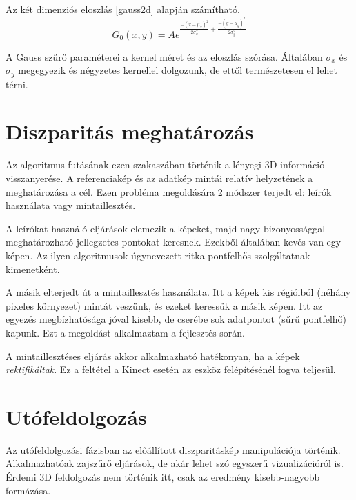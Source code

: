 Az két dimenziós eloszlás \eqref{gauss2d} alapján számítható.
\begin{equation}
G_0(x,y) = A e^{\frac{-(x-\mu_x)^2}{2 \sigma_x^2}+\frac{-(y-\mu_y)^2}{2 \sigma_y^2}}
\label{eq:gauss2d}
\end{equation}

A Gauss szűrő paraméterei a kernel méret és az eloszlás szórása.
Általában $\sigma_x$ és $\sigma_y$ megegyezik és négyzetes kernellel dolgozunk, de ettől természetesen el lehet térni.

\section{Diszparitás meghatározás}\label{sect:Depthproc}

Az algoritmus futásának ezen szakaszában történik a lényegi 3D információ visszanyerése.
A referenciakép és az adatkép mintái relatív helyzetének a meghatározása a cél.
Ezen probléma megoldására 2 módszer terjedt el: leírók használata vagy mintaillesztés.

A leírókat használó eljárások elemezik a képeket, majd nagy bizonyossággal meghatározható jellegzetes pontokat keresnek.
Ezekből általában kevés van egy képen.
Az ilyen algoritmusok úgynevezett ritka pontfelhős szolgáltatnak kimenetként.

A másik elterjedt út a mintaillesztés használata.
Itt a képek kis régióiból (néhány pixeles környezet) mintát veszünk, és ezeket keressük a másik képen.
Itt az egyezés megbízhatósága jóval kisebb, de cserébe sok adatpontot (sűrű pontfelhő) kapunk.
Ezt a megoldást alkalmaztam a fejlesztés során.

A mintaillesztéses eljárás akkor alkalmazható hatékonyan, ha a képek \emph{rektifikáltak}.
Ez a feltétel a Kinect esetén az eszköz felépítésénél fogva teljesül.

\section{Utófeldolgozás}\label{sect:Postproc}

Az utófeldolgozási fázisban az előállított diszparitáskép manipulációja történik.
Alkalmazhatóak zajszűrő eljárások, de akár lehet szó egyszerű vizualizációról is.
Érdemi 3D feldolgozás nem történik itt, csak az eredmény kisebb-nagyobb formázása.


